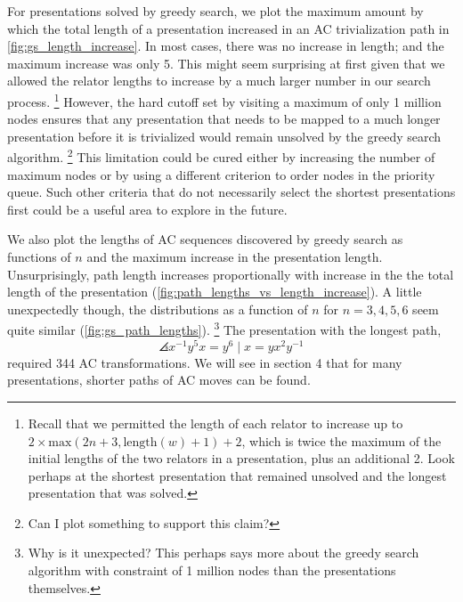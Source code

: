 For presentations solved by greedy search, we plot the maximum amount by which the total length of a presentation increased in an AC trivialization path in \autoref{fig:gs_length_increase}. In most cases, there was no increase in length; and the maximum increase was only 5. This might seem surprising at first given that we allowed the relator lengths to increase by a much larger number in our search process. 
\footnote{Recall that we permitted the length of each relator to increase up to \(2 \times \text{max}(2n+3, \text{length}(w)+1) + 2\), which is twice the maximum of the initial lengths of the two relators in a presentation, plus an additional 2.  Look perhaps at the shortest presentation that remained unsolved and the longest presentation that was solved.} However, the hard cutoff set by visiting a maximum of only 1 million nodes ensures that any presentation that needs to be mapped to a much longer presentation before it is trivialized would remain unsolved by the greedy search algorithm. 
\footnote{Can I plot something to support this claim?}
This limitation could be cured either by increasing the number of maximum nodes or by using a different criterion to order nodes in the priority queue. Such other criteria that do not necessarily select the shortest presentations first could be a useful area to explore in the future.
\newline

We also plot the lengths of AC sequences discovered by greedy search as functions of $n$ and the maximum increase in the presentation length. Unsurprisingly, path length increases proportionally with increase in the the total length of the presentation (\autoref{fig:path_lengths_vs_length_increase}). A little unexpectedly though, the distributions as a function of $n$ for $n = 3, 4, 5, 6$ seem quite similar (\autoref{fig:gs_path_lengths}).
\footnote{Why is it unexpected? This perhaps says more about the greedy search algorithm with constraint of 1 million nodes than the presentations themselves. }
The presentation with the longest path,
\[
\angles{x^{-1} y^5 x = y^6 \mid  x = y x^2 y^{-1}}
\]
required 344 AC transformations. We will see in section 4 that for many presentations, shorter paths of AC moves can be found.  
	
